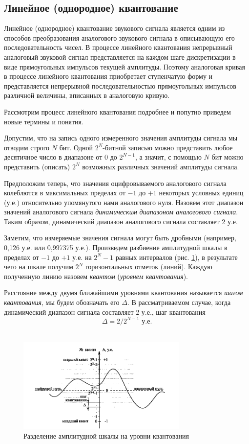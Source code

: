 \documentclass[oneside, final, 14pt]{extreport}
\begin{document}
\subsection{Линейное (однородное) квантование}
Линейное (однородное) квантование звукового сигнала является одним из способов преобразования аналогового звукового сигнала в описывающую его последовательность чисел. В процессе линейного квантования непрерывный аналоговый звуковой сигнал представляется на каждом шаге дискретизации в виде прямоугольных импульсов текущей амплитуды. Поэтому аналоговая кривая в процессе линейного квантования приобретает ступенчатую форму и представляется непрерывной последовательностью прямоугольных импульсов различной величины, вписанных в аналоговую кривую.

Рассмотрим процесс линейного квантования подробнее и попутно приведем новые термины и понятия.

Допустим, что на запись одного измеренного значения амплитуды сигнала мы отводим строго $N$ бит. Одной $2^N$-битной записью можно представить любое десятичное число в диапазоне от $0$ до $2^{N-1}$, а значит, с помощью $N$ бит можно представить (описать) $2^N$ возможных различных значений амплитуды
сигнала.

Предположим теперь, что значения оцифровываемого аналогового сигнала колеблются в максимальных пределах от $-1$ до $+1$ некоторых условных единиц
(у.е.) относительно упомянутого нами аналогового нуля. Назовем этот диапазон значений аналогового сигнала \textit{динамическим диапазоном аналогового сигнала}. Таким образом, динамический диапазон аналогового сигнала составляет 2 у.е. 

Заметим, что измеряемые значения сигнала могут быть дробными (например, 0,126 у.е. или 0,997375 у.е.). Произведем разбиение амплитудной шкалы в пределах от $-1$ до $+1$ у.е. на $2^N-1$ равных интервалов (рис. \ref{pic-digital-02}), в результате чего на шкале получим $2^N$ горизонтальных отметок (линий). Каждую полученную
линию назовем \textit{квантом} (\textit{уровнем квантования}). 

Расстояние между двумя ближайшими уровнями квантования называется \textit{шагом квантования}, мы будем обозначать его $\Delta$. В рассматриваемом случае, когда динамический диапазон сигнала составляет 2 у.е., шаг квантования 
\[\Delta=2/{2^{N-1}}\text{~у.е.}\]~

\begin{figure}[h]
\centering
\includegraphics[width=0.75\textwidth]{pic-digital-02}
\caption{Разделение амплитудной шкалы на уровни квантования}
\label{pic-digital-02}
\end{figure}
\end{document}
